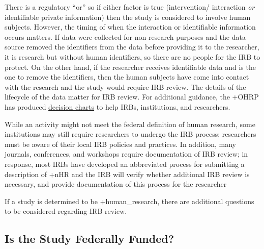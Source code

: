 \documentclass[
]{book}
\begin{document}
There is a regulatory ``or'' so if either factor is true (intervention/ interaction \emph{or} identifiable private information) then the study is considered to involve human subjects. However, the timing of when the interaction or identifiable information occurs matters. If data were collected for non-research purposes and the data source removed the identifiers from the data before providing it to the researcher, it is research but without human identifiers, so there are no people for the IRB to protect. On the other hand, if the researcher receives identifiable data and is the one to remove the identifiers, then the human subjects have come into contact with the research and the study would require IRB review. The details of the lifecycle of the data matter for IRB review. For additional guidance, the +OHRP\textbar{} has produced \href{https://www.hhs.gov/ohrp/regulations-and-policy/decision-charts/index.html}{decision charts} to help IRBs, institutions, and researchers.

While an activity might not meet the federal definition of human research, some institutions may still require researchers to undergo the IRB process; researchers must be aware of their local IRB policies and practices. In addition, many journals, conferences, and workshops require documentation of IRB review; in response, most IRBs have developed an abbreviated process for submitting a description of +nHR\textbar{} and the IRB will verify whether additional IRB review is necessary, and provide documentation of this process for the researcher

If a study is determined to be +human\_research\textbar, there are additional questions to be considered regarding IRB review.

\hypertarget{is-the-study-federally-funded}{%
\subsection{Is the Study Federally Funded?}\label{is-the-study-federally-funded}}
\end{document}
